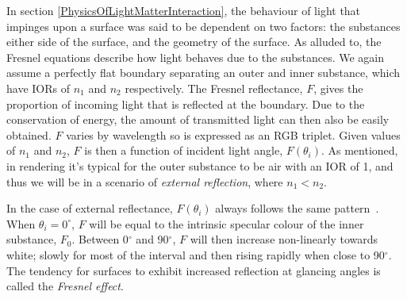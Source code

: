In section \ref{PhysicsOfLightMatterInteraction}, the behaviour of light that impinges upon a surface was said to be dependent on two factors: the substances either side of the surface, and the geometry of the surface. As alluded to, the Fresnel equations describe how light behaves due to the substances. We again assume a perfectly flat boundary separating an outer and inner substance, which have IORs of \begin{math}n_1\end{math} and \begin{math}n_2\end{math} respectively. The Fresnel reflectance, \begin{math}F\end{math}, gives the proportion of incoming light that is reflected at the boundary. Due to the conservation of energy, the amount of transmitted light can then also be easily obtained. \begin{math}F\end{math} varies by wavelength so is expressed as an RGB triplet. Given values of \begin{math}n_1\end{math} and \begin{math}n_2\end{math}, \begin{math}F\end{math} is then a function of incident light angle, \begin{math}F(\theta_i)\end{math}. As mentioned, in rendering it's typical for the outer substance to be air with an IOR of 1, and thus we will be in a scenario of \textit{external reflection}, where \begin{math}n_1 < n_2\end{math}.

In the case of external reflectance, \begin{math}F(\theta_i)\end{math} always follows the same pattern~\cite{RTR4}. When \begin{math}\theta_i = 0^\circ\end{math}, \begin{math}F\end{math} will be equal to the intrinsic specular colour of the inner substance, \begin{math}F_0\end{math}. Between 0$^{\circ}$ and 90$^{\circ}$, \begin{math}F\end{math} will then increase non-linearly towards white; slowly for most of the interval and then rising rapidly when close to 90$^{\circ}$. The tendency for surfaces to exhibit increased reflection at glancing angles is called the \textit{Fresnel effect}.

